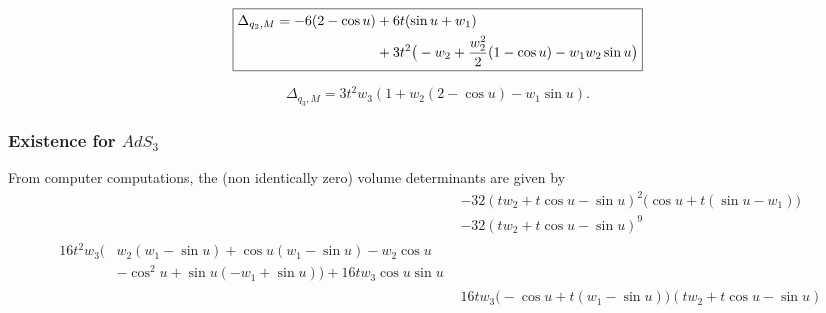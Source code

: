 \begin{equation}
	\boxed{%
		\begin{aligned}
			\Delta_{q_2,M}=-6(2-\cos u) & +6t(\sin u+w_1) \\&+3t^2\big(
			-w_2+\frac{w_2^2}{2}(1-\cos u)-w_1w_2\sin u
			\big)
		\end{aligned}
	}
\end{equation}

\begin{equation}
	\boxed
	{
		\Delta_{q_3,M}=3t^2w_3(1+w_2(2-\cos u)-w_1\sin u).
	}
\end{equation}

\subsubsection{Existence for \texorpdfstring{$AdS_3$}{AdS3}}

From computer computations, the (non identically zero) volume determinants are given by
\begin{subequations}
	\begin{align}
		 & -32(tw_2+t\cos u-\sin u)^2\big(\cos u+t(\sin u-w_1)\big)  \\
		 & -32(tw_2+t\cos u-\sin u)^9                                \\
		\begin{split}
			16t^2w_3\Big( & w_2(w_1-\sin u)+\cos u(w_1-\sin u)-w_2\cos u \\
			              & -\cos^2u+\sin u(-w_1+\sin u)
			\Big)+16tw_3\cos u\sin u
		\end{split} \\
		 & 16tw_3
		\big(
		-\cos u+t(w_1-\sin u)
		\big)
		(tw_2+t\cos u-\sin u)
	\end{align}
\end{subequations}


